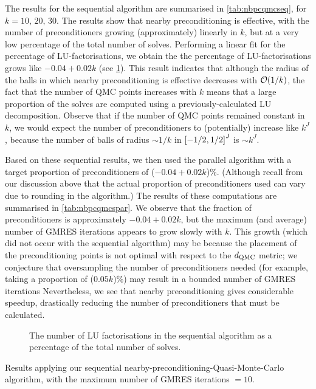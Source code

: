     The results for the sequential algorithm are summarised in \cref{tab:nbpcqmcseq}, for $k = 10,\,20,\,30$. The results show that nearby preconditioning is effective, with the number of preconditioners growing (approximately) linearly in $k$, but at a very low percentage of the total number of solves. Performing a linear fit for the percentage of LU-factorisations, we obtain the the percentage of LU-factorisations grows like $-0.04 + 0.02k$ (see \cref{fig:lu}). This result indicates that although the radius of the balls in which nearby preconditioning is effective decreases with $\cO\mleft(1/k\mright)$, the fact that the number of QMC points increases with $k$ means that a large proportion of the solves are computed using a previously-calculated LU decomposition. Observe that if the number of QMC points remained constant in $k$, we would expect the number of preconditioners to (potentially) increase like $k^J$, because the number of balls of radius $\sim 1/k$ in $\cube{J}$ is $\sim k^J.$

    Based on these sequential results, we then used the parallel algorithm with a target proportion of preconditioners of ($-0.04 + 0.02k$)\%. (Although recall from our discussion above that the actual proportion of preconditioners used can vary due to rounding in the algorithm.) The results of these computations are summarised in \cref{tab:nbpcqmcspar}. We observe that the fraction of preconditioners is approximately $-0.04 + 0.02k$, but the maximum (and average) number of GMRES iterations appears to grow slowly with $k.$ This growth (which did not occur with the sequential algorithm) may be because the placement of the preconditioning points is not optimal with respect to the $d_{\mathrm{QMC}}$ metric; we conjecture that oversampling the number of preconditioners needed (for example, taking a proportion of ($0.05k$)\%) may result in a bounded number of GMRES iterations Nevertheless, we see that nearby preconditioning gives considerable speedup, drastically reducing the number of preconditioners that must be calculated.

    \begin{figure}
      
      \caption{The number of LU factorisations in the sequential algorithm as a percentage of the total number of solves.\label{fig:lu}}
      \end{figure}
    
    \begin{table}
  \centering
  
  \caption{Results applying our sequential nearby-preconditioning-Quasi-Monte-Carlo algorithm, with the maximum number of GMRES iterations $=10$.}\label{tab:nbpcqmcseq}
\end{table}

